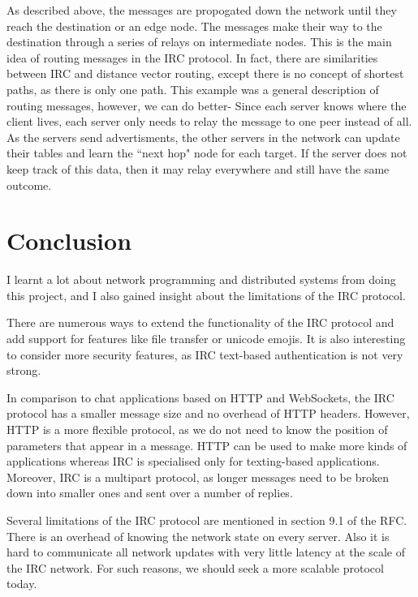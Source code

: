 \documentclass[letterpaper,twocolumn,10pt]{article}
\begin{document}
As described above, the messages are propogated down the network until they reach
the destination or an edge node. The messages make their way to the destination
through a series of relays on intermediate nodes. This is the main idea of routing
messages in the IRC protocol. In fact, there are similarities between IRC and
distance vector routing, except there is no concept of shortest paths, as there is only one path.
This example was a general description of routing
messages, however, we can do better- Since each server knows where the client lives,
each server only needs to relay the message to one peer instead of all. As the servers
send advertisments, the other servers in the network can update their tables and learn
the ``next hop" node for each target. If the server does not keep track of this data,
then it may relay everywhere and still have the same outcome.

\section{Conclusion}

I learnt a lot about network programming and distributed
systems from doing this project, and I also gained insight about the limitations
of the IRC protocol.

There are numerous ways to extend the functionality of the IRC
protocol and add support for features like file transfer or unicode emojis.
It is also interesting to consider more security features, as IRC
text-based authentication is not very strong.

In comparison to chat applications based on HTTP and WebSockets, the IRC
protocol has a smaller message size and no overhead of HTTP headers.
However, HTTP is a more flexible protocol, as we do not need
to know the position of parameters that appear in a message.
HTTP can be used to make more kinds of applications whereas IRC is specialised
only for texting-based applications. Moreover, IRC is a multipart protocol, as
longer messages need to be broken down into smaller ones and sent over a number
of replies.

Several limitations of the IRC protocol are mentioned in section 9.1 of the
RFC. There is an overhead of knowing the network state on every server. Also
it is hard to communicate all network updates with very little latency at the scale
of the IRC network. For such reasons, we should seek a more scalable protocol today.
\end{document}
